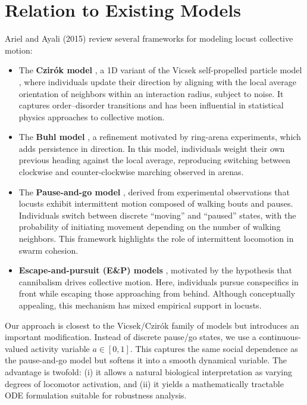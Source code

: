 \documentclass[11pt,a4paper]{article}
\begin{document}
\section{Relation to Existing Models}

Ariel and Ayali (2015) review several frameworks for modeling locust collective motion:

\begin{itemize}
    \item The \textbf{Czirók model} \cite{czirok1999collective}, a 1D variant of the Vicsek self-propelled particle model \cite{vicsek1995novel}, where individuals update their direction by aligning with the local average orientation of neighbors within an interaction radius, subject to noise. It captures order--disorder transitions and has been influential in statistical physics approaches to collective motion.

    \item The \textbf{Buhl model} \cite{buhl2006disorder}, a refinement motivated by ring-arena experiments, which adds persistence in direction. In this model, individuals weight their own previous heading against the local average, reproducing switching between clockwise and counter-clockwise marching observed in arenas.

    \item The \textbf{Pause-and-go model} \cite{ariel2014pausego}, derived from experimental observations that locusts exhibit intermittent motion composed of walking bouts and pauses. Individuals switch between discrete ``moving'' and ``paused'' states, with the probability of initiating movement depending on the number of walking neighbors. This framework highlights the role of intermittent locomotion in swarm cohesion.

    \item \textbf{Escape-and-pursuit (E\&P) models} \cite{romanczuk2012active}, motivated by the hypothesis that cannibalism drives collective motion. Here, individuals pursue conspecifics in front while escaping those approaching from behind. Although conceptually appealing, this mechanism has mixed empirical support in locusts.
\end{itemize}

Our approach is closest to the Vicsek/Czirók family of models but introduces an important modification. Instead of discrete pause/go states, we use a continuous-valued activity variable $a \in [0,1]$. This captures the same social dependence as the pause-and-go model but softens it into a smooth dynamical variable. The advantage is twofold: (i) it allows a natural biological interpretation as varying degrees of locomotor activation, and (ii) it yields a mathematically tractable ODE formulation suitable for robustness analysis.
\end{document}
